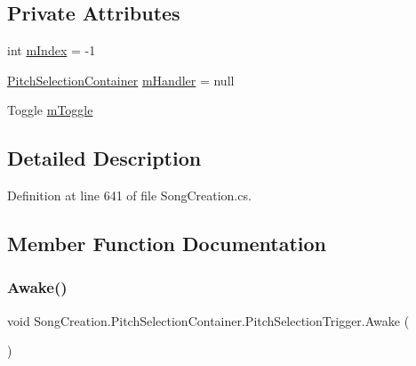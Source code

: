 \subsection*{Private Attributes}
\begin{DoxyCompactItemize}
\item 
int \hyperlink{class_song_creation_1_1_pitch_selection_container_1_1_pitch_selection_trigger_a6fa7a0883292035fef62858a69044010}{m\+Index} = -\/1
\item 
\hyperlink{class_song_creation_1_1_pitch_selection_container}{Pitch\+Selection\+Container} \hyperlink{class_song_creation_1_1_pitch_selection_container_1_1_pitch_selection_trigger_aad92d071482ccc179c9a40cada09785b}{m\+Handler} = null
\item 
Toggle \hyperlink{class_song_creation_1_1_pitch_selection_container_1_1_pitch_selection_trigger_aa289269d96356379b79d3918535561fd}{m\+Toggle}
\end{DoxyCompactItemize}


\subsection{Detailed Description}


Definition at line 641 of file Song\+Creation.\+cs.



\subsection{Member Function Documentation}
\mbox{\label{class_song_creation_1_1_pitch_selection_container_1_1_pitch_selection_trigger_ae07e3c0a5aa45a8b064abb9cea88c1d6}} 
\subsubsection{\texorpdfstring{Awake()}{Awake()}}
{\footnotesize\ttfamily void Song\+Creation.\+Pitch\+Selection\+Container.\+Pitch\+Selection\+Trigger.\+Awake (\begin{DoxyParamCaption}{ }\end{DoxyParamCaption})\hspace{0.3cm}{\ttfamily [private]}}



